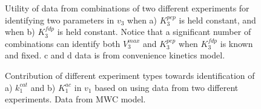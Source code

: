 \documentclass[10pt]{article}
\begin{document}
\begin{figure}[!tbhp]
	\caption{Utility of data from combinations of two different experiments for identifying two parameters in $v_3$ when a) $K_3^{pep}$ is held constant, and when b) $K_3^{fdp}$ is held constant. Notice that a significant number of combinations can identify both $V_3^{max}$ and $K_3^{pep}$ when $K_3^{fdp}$ is known and fixed. c and d data is from convenience kinetics model.}%
\end{figure}		

\begin{figure}[!tbhp]
	\caption{Contribution of different experiment types towards identification of a) $k_1^{cat}$ and b) $K_1^{ac}$ in $v_1$ based on using data from two different experiments. Data from MWC model.}%
\end{figure} 	
\end{document}
